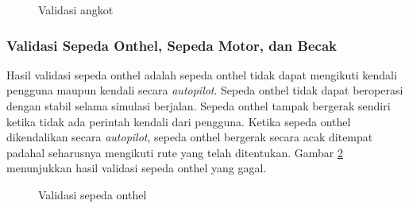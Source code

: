 \begin{figure}[!h]
    \centering
    \hfill
    \caption{Validasi angkot}
    \label{fig:angkot-validation}
\end{figure}

\subsubsection{Validasi Sepeda Onthel, Sepeda Motor, dan Becak}

Hasil validasi sepeda onthel adalah sepeda onthel tidak dapat mengikuti kendali
pengguna maupun kendali secara \textit{autopilot}. Sepeda onthel tidak dapat
beroperasi dengan stabil selama simulasi berjalan. Sepeda onthel tampak bergerak
sendiri ketika tidak ada perintah kendali dari pengguna. Ketika sepeda onthel
dikendalikan secara \textit{autopilot}, sepeda onthel bergerak secara acak
ditempat padahal seharusnya mengikuti rute yang telah ditentukan. Gambar
\ref{fig:onthel-validation} menunjukkan hasil validasi sepeda onthel yang gagal.

\begin{figure}[!h]
    \centering
    \hfill
    \caption{Validasi sepeda onthel}
    \label{fig:onthel-validation}
\end{figure}

